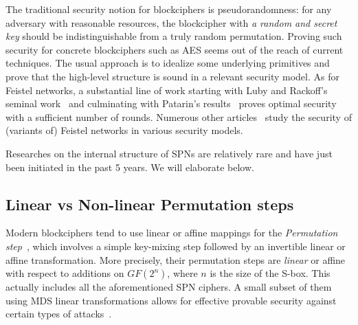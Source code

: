 The traditional security notion for blockciphers is pseudorandomness: for any adversary with reasonable resources, the blockcipher with {\it a random and secret key} should be indistinguishable from a truly random
permutation. Proving such security for concrete blockciphers such as AES
seems out of the reach of current techniques. The usual approach is to idealize some underlying primitives and prove that the
high-level structure is sound in a relevant security model. As for Feistel networks, a substantial line of work starting with Luby and Rackoff's seminal work~\cite{DBLP:journals/siamcomp/LubyR88}
and culminating with Patarin's results~\cite{C:patarin03} proves optimal security with
a sufficient number of rounds. Numerous other articles~\cite{C:HoaRog10,JC:CHKPST16} study the security of (variants of) Feistel networks in various
security models.




Researches on the internal structure of SPNs are relatively rare and have just been initiated in the past 5 years. We will elaborate below.




\subsection{Linear vs Non-linear Permutation steps}

Modern blockciphers tend to use linear or affine mappings for the {\it Permutation step}~\cite{DBLP:reference/crypt/Biryukov11aa}, which involves a simple key-mixing step followed
by an invertible linear or affine transformation. More precisely, their permutation steps are {\it linear} or affine with respect to additions on $GF(2^n)$, where $n$ is the size of the S-box. This actually includes all the aforementioned SPN ciphers. A small subset of them using MDS linear transformations allows for effective provable security against certain types of attacks~\cite{IMA:DaeRij01,AC:PSCYL02,FSE:PSLL03,miles2015substitution,EC:SLGRL16}.



